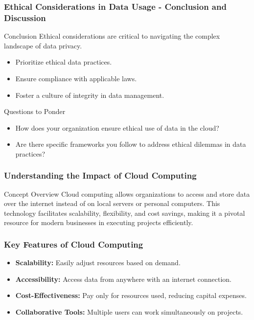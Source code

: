\documentclass[aspectratio=169]{beamer}
\begin{document}
\begin{frame}[fragile]
    \frametitle{Ethical Considerations in Data Usage - Conclusion and Discussion}
    \begin{block}{Conclusion}
        Ethical considerations are critical to navigating the complex landscape of data privacy.
        \begin{itemize}
            \item Prioritize ethical data practices.
            \item Ensure compliance with applicable laws.
            \item Foster a culture of integrity in data management.
        \end{itemize}
    \end{block}
    \begin{block}{Questions to Ponder}
        \begin{itemize}
            \item How does your organization ensure ethical use of data in the cloud?
            \item Are there specific frameworks you follow to address ethical dilemmas in data practices?
        \end{itemize}
    \end{block}
\end{frame}

\begin{frame}[fragile]
    \frametitle{Understanding the Impact of Cloud Computing}
    \begin{block}{Concept Overview}
        Cloud computing allows organizations to access and store data over the internet instead of on local servers or personal computers. 
        This technology facilitates scalability, flexibility, and cost savings, making it a pivotal resource for modern businesses in executing projects efficiently.
    \end{block}
\end{frame}

\begin{frame}[fragile]
    \frametitle{Key Features of Cloud Computing}
    \begin{itemize}
        \item \textbf{Scalability:} Easily adjust resources based on demand.
        \item \textbf{Accessibility:} Access data from anywhere with an internet connection.
        \item \textbf{Cost-Effectiveness:} Pay only for resources used, reducing capital expenses.
        \item \textbf{Collaborative Tools:} Multiple users can work simultaneously on projects.
    \end{itemize}
\end{frame}
\end{document}
